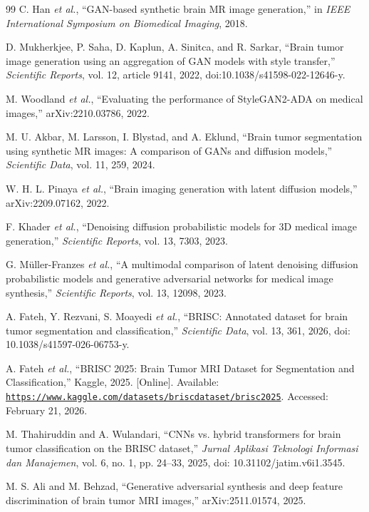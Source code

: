 \documentclass[conference,twoside]{IEEEtran}
\DeclareRobustCommand{\monourl}[1]{{\ttfamily\href{#1}{\nolinkurl{#1}}}}
\begin{document}
\begin{thebibliography}{99}
C. Han \textit{et al.}, ``GAN-based synthetic brain MR image generation,'' in \emph{IEEE International Symposium on Biomedical Imaging}, 2018.

D. Mukherkjee, P. Saha, D. Kaplun, A. Sinitca, and R. Sarkar, ``Brain tumor image generation using an aggregation of GAN models with style transfer,'' \emph{Scientific Reports}, vol. 12, article 9141, 2022, doi:10.1038/s41598-022-12646-y.

M. Woodland \textit{et al.}, ``Evaluating the performance of StyleGAN2-ADA on medical images,'' arXiv:2210.03786, 2022.

M. U. Akbar, M. Larsson, I. Blystad, and A. Eklund, ``Brain tumor segmentation using synthetic MR images: A comparison of GANs and diffusion models,'' \emph{Scientific Data}, vol. 11, 259, 2024.

W. H. L. Pinaya \textit{et al.}, ``Brain imaging generation with latent diffusion models,'' arXiv:2209.07162, 2022.

F. Khader \textit{et al.}, ``Denoising diffusion probabilistic models for 3D medical image generation,'' \emph{Scientific Reports}, vol. 13, 7303, 2023.

G. M{\"u}ller-Franzes \textit{et al.}, ``A multimodal comparison of latent denoising diffusion probabilistic models and generative adversarial networks for medical image synthesis,'' \emph{Scientific Reports}, vol. 13, 12098, 2023.

A. Fateh, Y. Rezvani, S. Moayedi \textit{et al.}, ``BRISC: Annotated dataset for brain tumor segmentation and classification,'' \emph{Scientific Data}, vol. 13, 361, 2026, doi: 10.1038/s41597-026-06753-y.

A. Fateh \textit{et al.}, ``BRISC 2025: Brain Tumor MRI Dataset for Segmentation and Classification,'' Kaggle, 2025. [Online]. Available: \monourl{https://www.kaggle.com/datasets/briscdataset/brisc2025}. Accessed: February 21, 2026.

M. Thahiruddin and A. Wulandari, ``CNNs vs. hybrid transformers for brain tumor classification on the BRISC dataset,'' \emph{Jurnal Aplikasi Teknologi Informasi dan Manajemen}, vol. 6, no. 1, pp. 24--33, 2025, doi: 10.31102/jatim.v6i1.3545.

M. S. Ali and M. Behzad, ``Generative adversarial synthesis and deep feature discrimination of brain tumor MRI images,'' arXiv:2511.01574, 2025.


\end{thebibliography}
\end{document}
